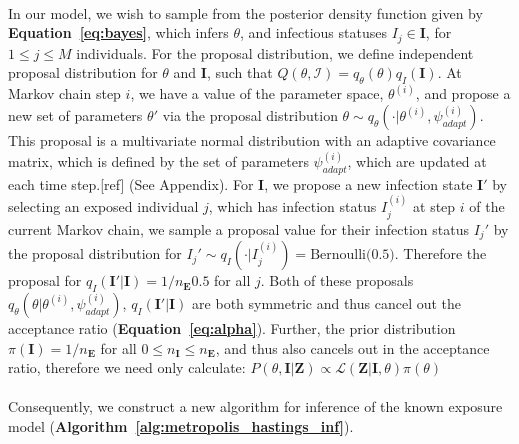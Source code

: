 \paragraph{}In our model, we wish to sample from the posterior density function given by \textbf{Equation~\ref{eq:bayes}}, which infers $\theta$, and infectious statuses ${I_j} \in \mathbf{I}$, for $1 \leq j \leq M$ individuals. For the proposal distribution, we define independent proposal distribution for $\theta$ and $\mathbf{I}$,  such that $Q(\theta, \mathcal{I}) = q_\theta(\theta)q_I(\mathbf{I})$. At Markov chain step $i$, we have a value of the parameter space, $\theta^{(i)}$, and propose a new set of parameters $\theta'$ via the proposal distribution $\theta \sim q_\theta(\cdot | \theta^{(i)}, \psi^{(i)}_{adapt})$. This proposal is a multivariate normal distribution with an adaptive covariance matrix, which is defined by the set of parameters $\psi^{(i)}_{adapt}$, which are updated at each time step.[ref] (See Appendix). For $\mathbf{I}$, we propose a new infection state $\mathbf{I}'$ by selecting an exposed individual $j$, which has infection status $I_j^{(i)}$ at step $i$ of the current Markov chain, we sample a proposal value for their infection status $I_j'$ by the proposal distribution for $I_j' \sim q_I(\cdot | I^{(i)}_j)= \text{Bernoulli(0.5)}$. Therefore the proposal for $q_I(\mathbf{I}'|\mathbf{I}) = 1/n_\mathbf{E}0.5$ for all $j$. Both of these proposals $q_\theta\left(\theta | \theta^{(i)}, \psi^{(i)}_{adapt}\right)$, $q_I(\mathbf{I}'|\mathbf{I})$ are both symmetric and thus cancel out the acceptance ratio (\textbf{Equation~\ref{eq:alpha}}). Further, the prior distribution $\pi(\mathbf{I}) = 1 / n_\mathbf{E}$ for all $0 \leq n_\mathbf{I} \leq n_\mathbf{E}$, and thus also cancels out in the acceptance ratio, therefore we need only calculate: $P(\theta, \mathbf{I} | \mathbf{Z}) \propto \mathcal{L}(\mathbf{Z} | \mathbf{I}, \theta)\pi(\theta)$

\paragraph{}Consequently, we construct a new algorithm for inference of the known exposure model (\textbf{Algorithm~\ref{alg:metropolis_hastings_inf}}).

